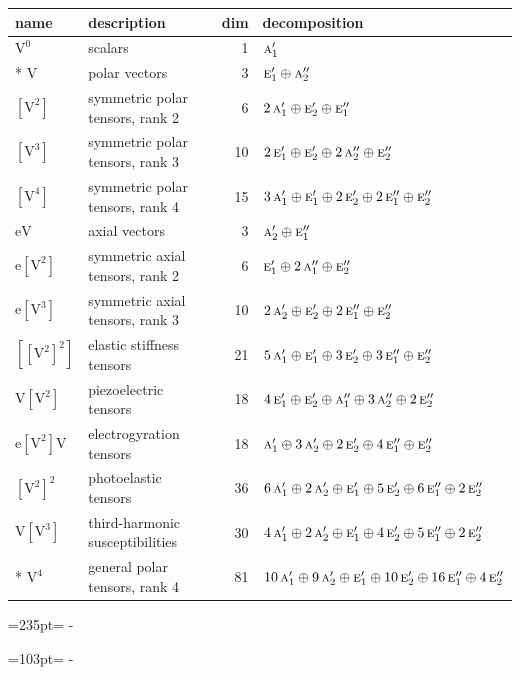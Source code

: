 \documentclass[10pt,a4paper]{article}
\newcommand{\needspace}[1]{\par\penalty-100\begingroup\dimen0=#1\relax\dimen2=\pagegoal
  \advance\dimen2-\pagetotal\ifdim\dimen0>\dimen2\relax\ifdim\dimen2>0pt\vfil\break\fi\fi
  \endgroup}
\numberwithin{equation}{section}
\newcommand{\irr}[1]{\text{\normalfont\scshape #1}}
\newcommand{\jahn}[1]{\mathrm{#1}}
\newlength{\fillwidth}\newlength{\cellwidth}\newlength{\colwidth}
\begin{document}
{\begin{longtable}{@{}llr>{\RaggedRight\arraybackslash}p{\fillwidth}@{}}
name & description & dim & decomposition\\\midrule\endhead
\bottomrule\endfoot\endlastfoot
$\jahn{V^{0}}$ & scalars & 1 & $\irr{a}_{1}'$\\*
$\jahn{V}$ & polar vectors & 3 & $\irr{e}_{1}' \oplus\allowbreak \irr{a}_{2}''$\\
$\jahn{[V^{2}]}$ & symmetric polar tensors, rank 2 & 6 & $2\,\irr{a}_{1}' \oplus\allowbreak \irr{e}_{2}' \oplus\allowbreak \irr{e}_{1}''$\\
$\jahn{[V^{3}]}$ & symmetric polar tensors, rank 3 & 10 & $2\,\irr{e}_{1}' \oplus\allowbreak \irr{e}_{2}' \oplus\allowbreak 2\,\irr{a}_{2}'' \oplus\allowbreak \irr{e}_{2}''$\\
$\jahn{[V^{4}]}$ & symmetric polar tensors, rank 4 & 15 & $3\,\irr{a}_{1}' \oplus\allowbreak \irr{e}_{1}' \oplus\allowbreak 2\,\irr{e}_{2}' \oplus\allowbreak 2\,\irr{e}_{1}'' \oplus\allowbreak \irr{e}_{2}''$\\
$\jahn{eV}$ & axial vectors & 3 & $\irr{a}_{2}' \oplus\allowbreak \irr{e}_{1}''$\\
$\jahn{e[V^{2}]}$ & symmetric axial tensors, rank 2 & 6 & $\irr{e}_{1}' \oplus\allowbreak 2\,\irr{a}_{1}'' \oplus\allowbreak \irr{e}_{2}''$\\
$\jahn{e[V^{3}]}$ & symmetric axial tensors, rank 3 & 10 & $2\,\irr{a}_{2}' \oplus\allowbreak \irr{e}_{2}' \oplus\allowbreak 2\,\irr{e}_{1}'' \oplus\allowbreak \irr{e}_{2}''$\\
$\jahn{[[V^{2}]^{2}]}$ & elastic stiffness tensors & 21 & $5\,\irr{a}_{1}' \oplus\allowbreak \irr{e}_{1}' \oplus\allowbreak 3\,\irr{e}_{2}' \oplus\allowbreak 3\,\irr{e}_{1}'' \oplus\allowbreak \irr{e}_{2}''$\\
$\jahn{V[V^{2}]}$ & piezoelectric tensors & 18 & $4\,\irr{e}_{1}' \oplus\allowbreak \irr{e}_{2}' \oplus\allowbreak \irr{a}_{1}'' \oplus\allowbreak 3\,\irr{a}_{2}'' \oplus\allowbreak 2\,\irr{e}_{2}''$\\
$\jahn{e[V^{2}]V}$ & electrogyration tensors & 18 & $\irr{a}_{1}' \oplus\allowbreak 3\,\irr{a}_{2}' \oplus\allowbreak 2\,\irr{e}_{2}' \oplus\allowbreak 4\,\irr{e}_{1}'' \oplus\allowbreak \irr{e}_{2}''$\\
$\jahn{[V^{2}]^{2}}$ & photoelastic tensors & 36 & $6\,\irr{a}_{1}' \oplus\allowbreak 2\,\irr{a}_{2}' \oplus\allowbreak \irr{e}_{1}' \oplus\allowbreak 5\,\irr{e}_{2}' \oplus\allowbreak 6\,\irr{e}_{1}'' \oplus\allowbreak 2\,\irr{e}_{2}''$\\
$\jahn{V[V^{3}]}$ & third-harmonic susceptibilities & 30 & $4\,\irr{a}_{1}' \oplus\allowbreak 2\,\irr{a}_{2}' \oplus\allowbreak \irr{e}_{1}' \oplus\allowbreak 4\,\irr{e}_{2}' \oplus\allowbreak 5\,\irr{e}_{1}'' \oplus\allowbreak 2\,\irr{e}_{2}''$\\*
$\jahn{V^{4}}$ & general polar tensors, rank 4 & 81 & $10\,\irr{a}_{1}' \oplus\allowbreak 9\,\irr{a}_{2}' \oplus\allowbreak \irr{e}_{1}' \oplus\allowbreak 10\,\irr{e}_{2}' \oplus\allowbreak 16\,\irr{e}_{1}'' \oplus\allowbreak 4\,\irr{e}_{2}''$\\
\bottomrule\end{longtable}}
\needspace{235pt}
\needspace{103pt}
\end{document}
